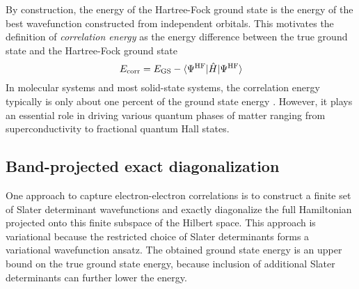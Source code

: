 \documentclass[
 reprint,
 amsmath,amssymb,
 aps, prx,
floatfix,longbibliography,
]{revtex4-2}
\begin{document}
By construction, the energy of the Hartree-Fock ground state is the energy of the best wavefunction constructed from independent orbitals. This motivates the definition of \emph{correlation energy} as the energy difference between the true ground state and the Hartree-Fock ground state
\begin{equation}
    E_{\rm corr} = E_{\rm GS} - \langle \Psi^{\rm HF} | \hat{H}| \Psi^{\rm HF} \rangle
    \label{eq:methods-correlation-energy}
\end{equation}
In molecular systems and most solid-state systems, the correlation energy typically is only about one percent of the ground state energy \cite{Foulkes2001Jan}. However, it plays an essential role in driving  various quantum phases of matter ranging from superconductivity to fractional quantum Hall states. 


\subsection{Band-projected exact diagonalization}

One approach to capture electron-electron correlations is to construct a finite set of Slater determinant wavefunctions and exactly diagonalize the full Hamiltonian projected onto this finite subspace of the Hilbert space. This approach is variational because the restricted choice of Slater determinants forms a variational wavefunction ansatz. The obtained ground state energy is an upper bound on the true ground state energy, because inclusion of additional Slater determinants can further lower the energy. 
\end{document}
